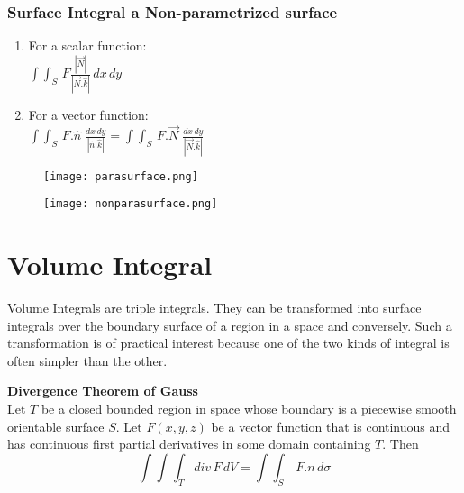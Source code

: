 \documentclass[aima331_lecturenotes_ku.tex]{subfiles}
\begin{document}
  \subsubsection{Surface Integral a Non-parametrized surface}
  \begin{enumerate}
  \item For a scalar function: \\[1mm]
    $\displaystyle \int\int_S\, F\frac{|\vec{N}|}{|\vec{N}.\hat{k}|}\,dx\,dy$

      \item For a vector function: \\[1mm]
    $\displaystyle \int\int_S\, F.\hat{n}\;\frac{dx\,dy}{|\hat{n}.\hat{k}|} = \int\int_S\, F.\vec{N}\;\frac{dx\,dy}{|\vec{N}.\hat{k}|}$
  \end{enumerate}

  \begin{figure}[h]
  \centering
  \texttt{[image: parasurface.png]}
\end{figure}

\begin{figure}[h]
  \centering
  \texttt{[image: nonparasurface.png]}
\end{figure}

  \section{Volume Integral}
  Volume Integrals are triple integrals. They can be transformed into surface integrals over the boundary surface of a region in a space and conversely. Such a transformation is of practical interest because one of the two kinds of integral is often simpler than the other.
  \begin{mdframed}
    \textbf{Divergence Theorem of Gauss} \\[1mm]
    Let $T$ be a closed bounded region in space whose boundary is a piecewise smooth orientable surface $S$. Let $F(x,y,z)$ be a vector function that is continuous and has continuous first partial derivatives in some domain containing $T$. Then
    \begin{equation}
      \label{divergence}
      \int \int \int _T div \, F \, dV= \int \int _S\, F.n\,d\sigma
    \end{equation}
  \end{mdframed}
\end{document}
